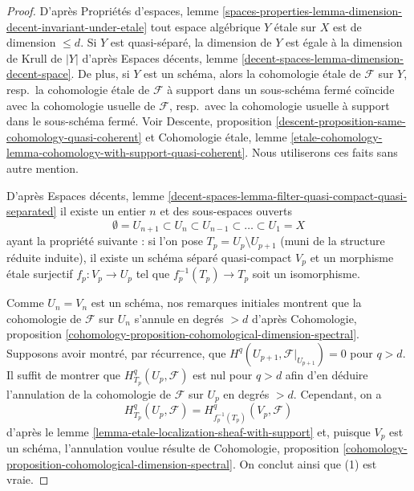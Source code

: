 \begin{proof}
D'après Propriétés d'espaces, lemme
\ref{spaces-properties-lemma-dimension-decent-invariant-under-etale}
tout espace algébrique $Y$ \'etale sur $X$ est de dimension $\leq d$.
Si $Y$ est quasi-séparé, la dimension de $Y$ est égale à la
dimension de Krull de $|Y|$ d'après 
Espaces décents, lemme \ref{decent-spaces-lemma-dimension-decent-space}.
De plus, si $Y$ est un schéma, alors la cohomologie \'etale de $\mathcal{F}$
sur $Y$, resp.\ la cohomologie \'etale de $\mathcal{F}$ à support dans un
sous-schéma fermé coïncide avec la cohomologie usuelle de $\mathcal{F}$,
resp.\ avec la cohomologie usuelle à support dans le sous-schéma fermé.
Voir
Descente, proposition \ref{descent-proposition-same-cohomology-quasi-coherent}
et
Cohomologie \'etale, lemme
\ref{etale-cohomology-lemma-cohomology-with-support-quasi-coherent}.
Nous utiliserons ces faits sans autre mention.

\medskip\noindent
D'après Espaces décents, lemme
\ref{decent-spaces-lemma-filter-quasi-compact-quasi-separated}
il existe un entier $n$ et des sous-espaces ouverts
$$
\emptyset = U_{n + 1} \subset
U_n \subset U_{n - 1} \subset \ldots \subset U_1 = X
$$
ayant la propriété suivante : si l'on pose $T_p = U_p \setminus U_{p + 1}$
(muni de la structure réduite induite), il existe un schéma séparé
quasi-compact $V_p$ et un morphisme \'etale surjectif $f_p : V_p \to U_p$
tel que $f_p^{-1}(T_p) \to T_p$ soit un isomorphisme.

\medskip\noindent
Comme $U_n = V_n$ est un schéma, nos remarques initiales montrent que la cohomologie de
$\mathcal{F}$ sur $U_n$ s'annule en degrés $> d$ d'après
Cohomologie, proposition
\ref{cohomology-proposition-cohomological-dimension-spectral}.
Supposons avoir montré, par récurrence, que
$H^q(U_{p + 1}, \mathcal{F}|_{U_{p + 1}}) = 0$ pour $q > d$.
Il suffit de montrer que $H_{T_p}^q(U_p, \mathcal{F})$ est nul pour
$q > d$ afin d'en déduire l'annulation de la cohomologie
de $\mathcal{F}$ sur $U_p$ en degrés $> d$.
Cependant, on a
$$
H^q_{T_p}(U_p, \mathcal{F}) = H^q_{f_p^{-1}(T_p)}(V_p, \mathcal{F})
$$
d'après le lemme \ref{lemma-etale-localization-sheaf-with-support}
et, puisque $V_p$ est un schéma, l'annulation voulue résulte de
Cohomologie, proposition
\ref{cohomology-proposition-cohomological-dimension-spectral}.
On conclut ainsi que (1) est vraie.


\end{proof}

